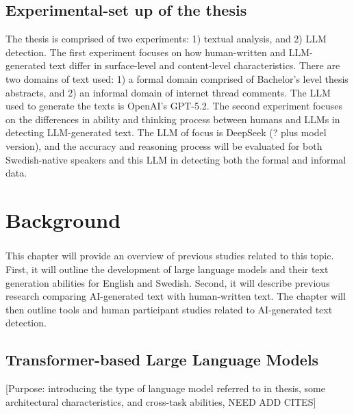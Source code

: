 \documentclass[thesis]{cluu}
\begin{document}
\section{Experimental-set up of the thesis}

The thesis is comprised of two experiments: 1) textual analysis,
and 2) LLM detection. The first experiment focuses on how
human-written and LLM-generated text differ in surface-level and
content-level characteristics. There are two domains of text
used: 1) a formal domain comprised of Bachelor's level thesis
abstracts, and 2) an informal domain of internet thread
comments. The LLM used to generate the texts is OpenAI's
GPT-5.2.
The second experiment focuses on the differences in ability and
thinking process between humans and LLMs in detecting
LLM-generated text. The LLM of focus is DeepSeek (? plus model
version), and the accuracy and reasoning process will be
evaluated for both Swedish-native speakers and this LLM in
detecting both the formal and informal data.


\chapter{Background}
\paragraph{}
This chapter will provide an overview of previous studies
related to this topic. First, it will outline the development of
large language models and their text generation abilities for
English and Swedish. Second, it will describe previous research
comparing AI-generated text with human-written text. The chapter
will then outline tools and human participant studies related to
AI-generated text detection.
\section{Transformer-based Large Language Models}
[Purpose: introducing the type of language model referred to in thesis, some architectural characteristics, and cross-task abilities, NEED ADD CITES]
\end{document}
